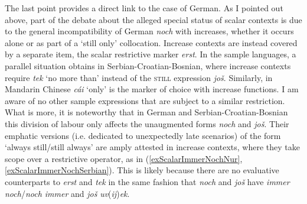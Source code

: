The last point provides a direct link to the case of German. As I pointed out above, part of the debate about the alleged special status of scalar contexts is due to the general incompatibility of German \textit{noch} with increases, whether it occurs alone or as part of a \lq still only\rq{ }collocation. Increase contexts are instead covered by a separate item, the scalar restrictive marker \textit{erst}. In the sample languages, a parallel situation obtains in Serbian\hyp Croatian\hyp Bosnian, where increase contexts require \textit{tek} \lq no more than\rq{ }instead of the \textsc{still} expression \textit{još}. Similarly, in Mandarin Chinese \textit{cái} \lq only\rq{ }is the marker of choice with increase functions. I am aware of no other sample expressions that are subject to a similar restriction. What is more, it is noteworthy that in German and Serbian\hyp Croatian\hyp Bosnian this division of labour only affects the unaugmented forms \textit{noch} and \textit{još}. Their emphatic versions (i.e. dedicated to unexpectedly late scenarios) of the form \lq always still/still always\rq{ }are amply attested in increase contexts, where they take scope over a restrictive operator, as in (\ref{exScalarImmerNochNur}, \ref{exScalarImmerNochSerbian}). This is likely because there are no evaluative counterparts to \textit{erst} and \textit{tek} in the same fashion that \textit{noch} and \textit{još} have \textit{immer noch}/\textit{noch immer} and \textit{još} \mbox{\textit{uv}(\textit{ij})\textit{ek}}.

